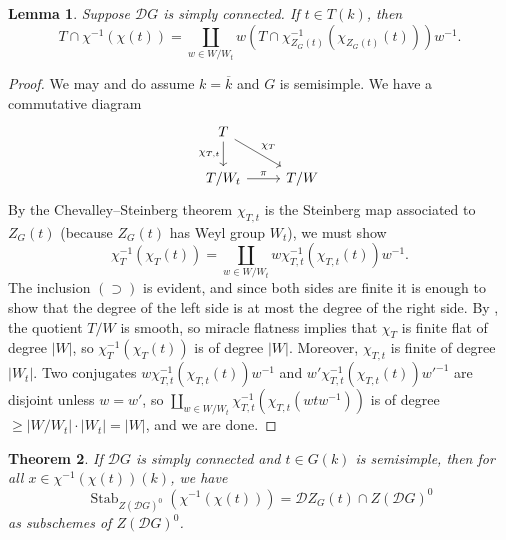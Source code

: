 \documentclass[11pt,reqno]{amsart}
\newtheorem{theorem}{Theorem}[section]
\newtheorem{lemma}[theorem]{Lemma}
\theoremstyle{definition}
\newcommand{\sD}{{\mathscr D}}
\DeclareMathOperator{\Stab}{Stab}
\newcommand{\ov}[1]{\overline{#1}}
\begin{document}
\begin{lemma}\label{lemma:omega-cap-Steinberg}
    Suppose $\sD G$ is simply connected. If $t \in T(k)$, then
    \[
    T \cap \chi^{-1}(\chi(t)) = \coprod_{w \in W/W_t} w(T \cap \chi_{Z_G(t)}^{-1}(\chi_{Z_G(t)}(t)))w^{-1}.
    \]
\end{lemma}

\begin{proof}
    We may and do assume $k = \ov{k}$ and $G$ is semisimple. We have a commutative diagram
    \[
    \begin{tikzcd}
    T \arrow{d}[swap]{\chi_{T,t}} \arrow[rd, "{\chi_{T}}"]
        & \\
    T/W_t \arrow[r, "\pi"]
        &T/W
    \end{tikzcd}
    \]
    By the Chevalley--Steinberg theorem \cite[Corollary 6.4]{SteinbergEndomorphisms} $\chi_{T,t}$ is the Steinberg map associated to $Z_G(t)$ (because $Z_G(t)$ has Weyl group $W_t$), we must show
    \[
    \chi_{T}^{-1}(\chi_{T}(t)) = \coprod_{w \in W/W_t} w\chi_{T,t}^{-1}(\chi_{T,t}(t))w^{-1}.
    \]
    The inclusion $(\supset)$ is evident, and since both sides are finite it is enough to show that the degree of the left side is at most the degree of the right side. By \cite[Lemma 6.3]{SteinbergReg}, the quotient $T/W$ is smooth, so miracle flatness implies that $\chi_T$ is finite flat of degree $|W|$, so $\chi_T^{-1}(\chi_T(t))$ is of degree $|W|$. Moreover, $\chi_{T,t}$ is finite of degree $|W_t|$. Two conjugates $w\chi_{T,t}^{-1}(\chi_{T,t}(t))w^{-1}$ and $w'\chi_{T,t}^{-1}(\chi_{T,t}(t))w'^{-1}$ are disjoint unless $w = w'$, so $\coprod_{w \in W/W_t} \chi_{T,t}^{-1}(\chi_{T,t}(wtw^{-1}))$ is of degree $\geq |W/W_t| \cdot |W_t| = |W|$, and we are done.
\end{proof}

\begin{theorem}\label{theorem:stabilizer-of-Steinberg}
    If $\sD G$ is simply connected and $t \in G(k)$ is semisimple, then for all $x \in \chi^{-1}(\chi(t))(k)$, we have
    \[
    \Stab_{Z(\sD G)^0}(\chi^{-1}(\chi(t))) = \sD Z_G(t) \cap Z(\sD G)^0
    \]
    as subschemes of $Z(\sD G)^0$.
\end{theorem}
\end{document}
